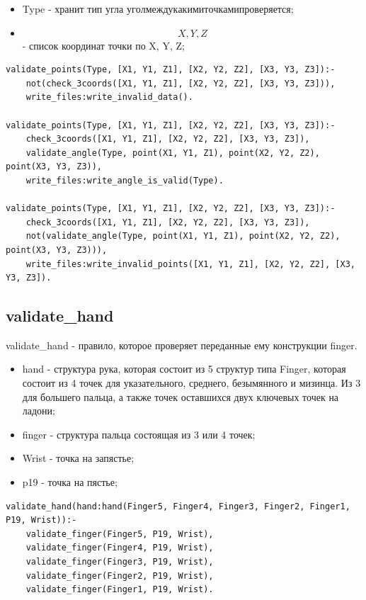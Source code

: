 \begin{itemize}
	\item Type - хранит тип угла \(угол между какими точками проверяется\);
	\item \[X,Y,Z\] - список координат точки по X, Y, Z;
\end{itemize}

\begin{lstlisting}[caption=Реализация правила validate\_points, label=rules:validatepoints]
validate_points(Type, [X1, Y1, Z1], [X2, Y2, Z2], [X3, Y3, Z3]):-
	not(check_3coords([X1, Y1, Z1], [X2, Y2, Z2], [X3, Y3, Z3])),
	write_files:write_invalid_data().

validate_points(Type, [X1, Y1, Z1], [X2, Y2, Z2], [X3, Y3, Z3]):-
	check_3coords([X1, Y1, Z1], [X2, Y2, Z2], [X3, Y3, Z3]),
	validate_angle(Type, point(X1, Y1, Z1), point(X2, Y2, Z2), point(X3, Y3, Z3)),
	write_files:write_angle_is_valid(Type).
	
validate_points(Type, [X1, Y1, Z1], [X2, Y2, Z2], [X3, Y3, Z3]):-
	check_3coords([X1, Y1, Z1], [X2, Y2, Z2], [X3, Y3, Z3]),
	not(validate_angle(Type, point(X1, Y1, Z1), point(X2, Y2, Z2), point(X3, Y3, Z3))),
	write_files:write_invalid_points([X1, Y1, Z1], [X2, Y2, Z2], [X3, Y3, Z3]).
\end{lstlisting}

\subsection{validate\_hand}
\hspace{0.6cm} validate\_hand - правило, которое проверяет переданные ему конструкции finger.

\begin{itemize}
	\item hand - структура рука, которая состоит из 5 структур типа Finger, которая состоит из 4 точек для указательного, среднего, безымянного и мизинца. Из 3 для большего пальца, а также точек оставшихся двух ключевых точек на ладони;
	\item finger - структура пальца состоящая из 3 или 4 точек;
	\item Wrist - точка на запястье;
	\item p19 - точка на пястье;
\end{itemize}

\begin{lstlisting}[caption=Реализация правила validate\_hand, label=rules:validatehand]
validate_hand(hand:hand(Finger5, Finger4, Finger3, Finger2, Finger1, P19, Wrist)):-
	validate_finger(Finger5, P19, Wrist),
	validate_finger(Finger4, P19, Wrist),
	validate_finger(Finger3, P19, Wrist),
	validate_finger(Finger2, P19, Wrist),
	validate_finger(Finger1, P19, Wrist).
\end{lstlisting}

